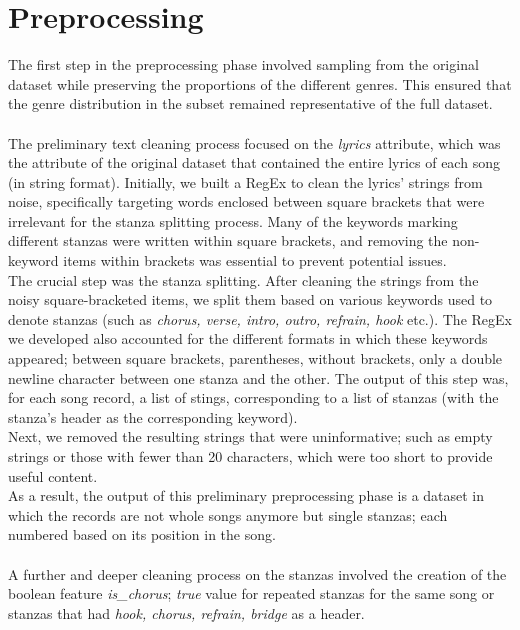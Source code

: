 \chapter{Preprocessing}
\label{ch:capitolo2}

The first step in the preprocessing phase involved sampling from the original dataset while preserving the proportions of the different genres. 
This ensured that the genre distribution in the subset remained representative of the full dataset.\\
\\
The preliminary text cleaning process focused on the \textit{lyrics} attribute, which was the attribute of the original dataset that contained
the entire lyrics of each song (in string format). Initially, we built a RegEx to clean the lyrics' strings from noise, specifically targeting words enclosed between square brackets that were irrelevant for the stanza splitting process.
Many of the keywords marking different stanzas were written within square brackets, and removing the non-keyword items within brackets was essential to prevent potential issues. \\
The crucial step was the stanza splitting. After cleaning the strings from the noisy square-bracketed items, we split them based on various keywords used to denote stanzas (such as \textit{chorus, verse, intro, outro, refrain, hook} etc.). 
The RegEx we developed also accounted for the different formats in which these keywords appeared; between square brackets, parentheses, without brackets, only a double newline character between one stanza and the other.
The output of this step was, for each song record, a list of stings, corresponding to a list of stanzas (with the stanza's header as the corresponding keyword). \\
Next, we removed the resulting strings that were uninformative; such as empty strings or those with fewer than 20 characters, which were too short to provide useful content. \\
As a result, the output of this preliminary preprocessing phase is a dataset in which the records are not whole songs anymore but single stanzas; each numbered based on its position in the song. \\
\\
A further and deeper cleaning process on the stanzas involved the creation of the boolean feature \textit{is\_chorus}; \textit{true} value for repeated stanzas for the same song or stanzas that had \textit{hook, chorus, refrain, bridge} as a header. \\
